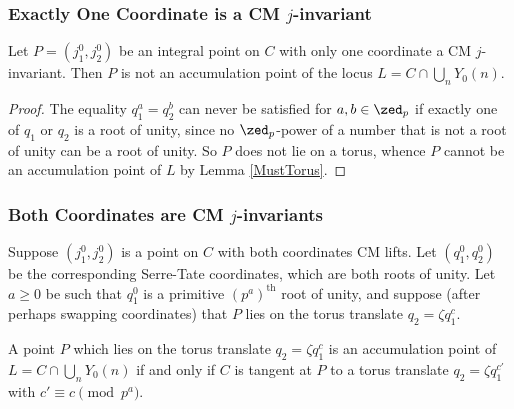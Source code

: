 \documentclass[12pt,letterpaper]{article}
\begin{document}
	
	
	
	
	
	
	
	
	
	
	
	\subsubsection{Exactly One Coordinate is a CM $j$-invariant}
	
	\begin{prop}
		Let $P= (j_1^0,j_2^0)$ be an integral point on $C$ with only one coordinate a CM $j$-invariant. Then $P$ is not an accumulation point of the locus $L=C\cap \bigcup_nY_0(n)$.
	\end{prop}
	
	\begin{proof}
		The equality $q_1^a = q_2^b$ can never be satisfied for $a,b\in \zed_p$ if exactly one of $q_1$ or $q_2$ is a root of unity, since no $\zed_p$-power of a number that is not a root of unity can be a root of unity. So $P$ does not lie on a torus, whence $P$ cannot be an accumulation point of $L$ by Lemma \ref{MustTorus}.
	\end{proof}
	
	
	
	
	
	
	
	\subsubsection{Both Coordinates are CM $j$-invariants}\label{CMcase}
	
	Suppose $(j_1^0,j_2^0)$ is a point on $C$ with both coordinates CM lifts. Let $(q_1^0,q_2^0)$ be the corresponding Serre-Tate coordinates, which are both roots of unity. Let $a\geq0$ be such that $q_1^0$ is a primitive $(p^a)^\text{th}$ root of unity, and suppose (after perhaps swapping coordinates) that $P$ lies on the torus translate $q_2 = \zeta q_1^c$.
	
	\begin{prop}
		 A point $P$ which lies on the torus translate $q_2 = \zeta q_1^c$ is an accumulation point of $L=C\cap \bigcup_nY_0(n)$ if and only if $C$ is tangent at $P$ to a torus translate $q_2= \zeta q_1^{c'}$ with $c'\equiv c \pmod{p^a}$.
	\end{prop}
	
\end{document}
